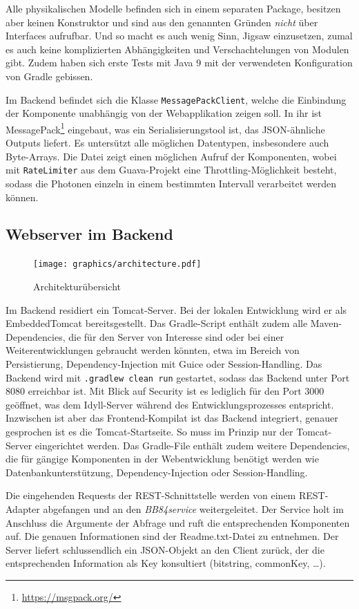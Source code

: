 \documentclass[a4paper,10.2pt,pdftex]{scrartcl}%
\begin{document}
Alle physikalischen Modelle befinden sich in einem separaten Package, besitzen aber keinen Konstruktor und sind aus den genannten Gründen \emph{nicht} über Interfaces aufrufbar. Und so macht es auch wenig Sinn, Jigsaw einzusetzen, zumal es auch keine komplizierten Abhängigkeiten und Verschachtelungen von Modulen gibt. Zudem haben sich erste Tests mit Java 9 mit der verwendeten Konfiguration von Gradle gebissen.  

Im Backend befindet sich die Klasse \texttt{MessagePackClient}, welche die Einbindung der Komponente unabhängig von der Webapplikation zeigen soll. In ihr ist MessagePack\footnote{\url{https://msgpack.org/}} eingebaut, was ein Serialisierungstool ist, das JSON-ähnliche Outputs liefert. Es untersützt alle möglichen Datentypen, insbesondere auch Byte-Arrays. Die Datei zeigt einen möglichen Aufruf der Komponenten, wobei mit \texttt{RateLimiter} aus dem Guava-Projekt eine Throttling-Möglichkeit besteht, sodass die Photonen einzeln in einem bestimmten Intervall verarbeitet werden können. 

\subsection{Webserver im Backend}
\begin{figure}
\texttt{[image: graphics/architecture.pdf]}
\caption{Architekturübersicht}
\end{figure}

Im Backend residiert ein Tomcat-Server. Bei der lokalen Entwicklung wird er als EmbeddedTomcat bereitsgestellt. Das Gradle-Script enthält zudem alle Maven-Dependencies, die für den Server von Interesse sind oder bei einer Weiterentwicklungen gebraucht werden könnten, etwa im Bereich von Persistierung, Dependency-Injection mit Guice oder Session-Handling. Das Backend wird mit \texttt{.gradlew clean run} gestartet, sodass das Backend unter Port 8080 erreichbar ist. Mit Blick auf Security ist es lediglich für den Port 3000 geöffnet, was dem Idyll-Server während des Entwicklungsprozesses entspricht. Inzwischen ist aber das Frontend-Kompilat ist das Backend integriert, genauer gesprochen ist es die Tomcat-Startseite. So muss im Prinzip nur der Tomcat-Server eingerichtet werden. Das Gradle-File enthält zudem weitere Dependencies, die für gängige Komponenten in der Webentwicklung benötigt werden wie Datenbankunterstützung, Dependency-Injection oder Session-Handling.

Die eingehenden Requests der REST-Schnittstelle werden von einem REST-Adapter abgefangen und an den \emph{BB84service} weitergeleitet. Der Service holt im Anschluss die Argumente der Abfrage und ruft die entsprechenden Komponenten auf. Die genauen Informationen sind der Readme.txt-Datei zu entnehmen. Der Server liefert schlussendlich ein JSON-Objekt an den Client zurück, der die entsprechenden Information als Key konsultiert (bitstring, commonKey, \dots). 
\end{document}
